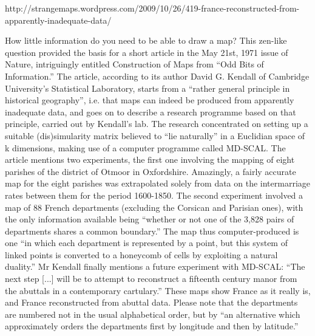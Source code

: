http://strangemaps.wordpress.com/2009/10/26/419-france-reconstructed-from-apparently-inadequate-data/


How little information do you need to be able to draw a map? This
zen-like question provided the basis for a short article in the May
21st, 1971 issue of Nature, intriguingly entitled Construction of Maps
from ``Odd Bits of Information.''  The article, according to its
author David G. Kendall of Cambridge University's Statistical
Laboratory, starts from a ``rather general principle in historical
geography'', i.e. that maps can indeed be produced from apparently
inadequate data, and goes on to describe a research programme based on
that principle, carried out by Kendall's lab.  The research
concentrated on setting up a suitable (dis)simularity matrix believed
to ``lie naturally'' in a Euclidian space of k dimensions, making use of
a computer programme called MD-SCAL. The article mentions two
experiments, the first one involving the mapping of eight parishes of
the district of Otmoor in Oxfordshire. Amazingly, a fairly accurate
map for the eight parishes was extrapolated solely from data on the
intermarriage rates between them for the period 1600-1850.  The second
experiment involved a map of 88 French departments (excluding the
Corsican and Parisian ones), with the only information available being
``whether or not one of the 3,828 pairs of departments shares a common
boundary.'' The map thus computer-produced is one ``in which each
department is represented by a point, but this system of linked points
is converted to a honeycomb of cells by exploiting a natural duality.''
Mr Kendall finally mentions a future experiment with MD-SCAL: ``The
next step [...] will be to attempt to reconstruct a fifteenth century
manor from the abuttals in a contemporary cartulary.''  These maps show
France as it really is, and France reconstructed from abuttal
data. Please note that the departments are numbered not in the usual
alphabetical order, but by ``an alternative which approximately orders
the departments first by longitude and then by latitude.''

